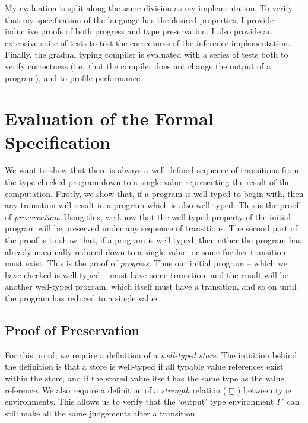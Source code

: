 \documentclass[12pt,a4paper,twoside,openright]{report}
\theoremstyle{definition}
\theoremstyle{dotless}
\begin{document}
My evaluation is split along the same division as my implementation. To verify
that my specification of the language has the desired properties, I provide
inductive proofs of both progress and type preservation.  I also provide an
extensive suite of tests to test the correctness of the inference
implementation. Finally, the gradual typing compiler is evaluated with a series
of tests both to verify correctness (i.e.~that the compiler does not change the
output of a program), and to profile performance.

\section{Evaluation of the Formal Specification}

We want to show that there is always a well-defined sequence of transitions
from the type-checked program down to a single value
representing the result of the computation. Firstly, we show that, if a program
is well typed to begin with, then any transition will result in a program which
is also well-typed. This is the proof of \textit{preservation}.  Using this, we
know that the well-typed property of the initial program will be preserved
under any sequence of transitions. The second part of the proof is to show
that, if a program is well-typed, then either the program has already maximally
reduced down to a single value, or some further transition must exist. This is
the proof of \textit{progress}. Thus our initial program -- which we have
checked is well typed -- must have some transition, and the result will be
another well-typed program, which itself must have a transition, and so on
until the program has reduced to a single value.

\subsection{Proof of Preservation}

For this proof, we require a definition of a \textit{well-typed store}.  The
intuition behind the definition is that a store is well-typed if all typable
value references exist within the store, and if the stored value
itself has the same type as the value reference. We also require a definition
of a \textit{strength} relation ($\sqsubseteq$) between type environments. This
allows us to verify that the `output' type environment $\Gamma'$ 
can still make all the same judgements after a transition.
\end{document}
